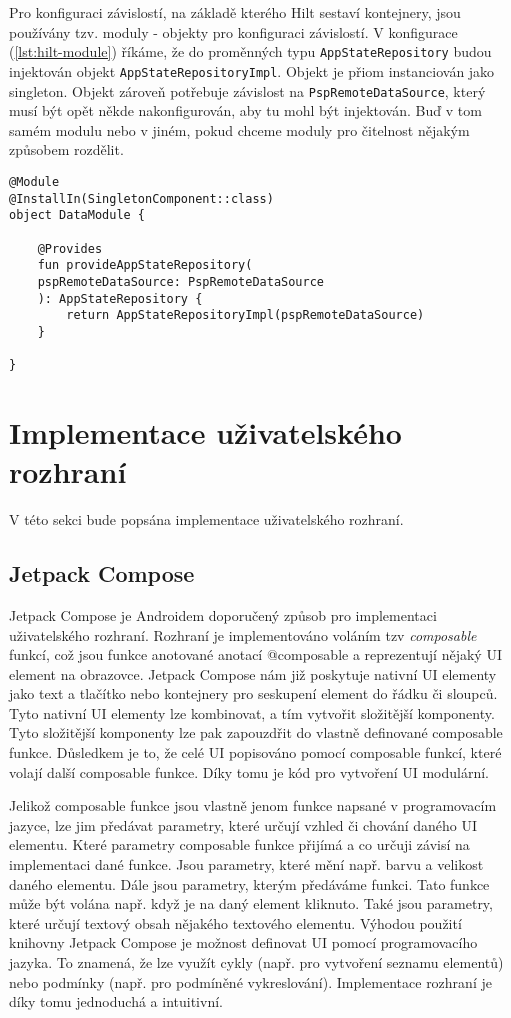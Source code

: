 \noindent Pro konfiguraci závislostí, na základě kterého Hilt sestaví kontejnery, jsou používány tzv. moduly - objekty pro konfiguraci závislostí. V konfigurace (\ref{lst:hilt-module}) říkáme, že do proměnných typu \lstinline|AppStateRepository| budou injektován objekt \lstinline|AppStateRepositoryImpl|. Objekt je přiom instanciován jako singleton. Objekt zároveň potřebuje závislost na \lstinline|PspRemoteDataSource|, který musí být opět někde nakonfigurován, aby tu mohl být injektován. Buď v tom samém modulu nebo v jiném, pokud chceme moduly pro čitelnost nějakým způsobem rozdělit.

\begin{lstlisting}[caption={Příklad konfigurace závislostí pro Hilt}, label={lst:hilt-module}, tabsize=2]
@Module
@InstallIn(SingletonComponent::class)
object DataModule {
	
	@Provides
	fun provideAppStateRepository(
	pspRemoteDataSource: PspRemoteDataSource
	): AppStateRepository {
		return AppStateRepositoryImpl(pspRemoteDataSource)
	}

}
\end{lstlisting}

\section {Implementace uživatelského rozhraní}
V této sekci bude popsána implementace uživatelského rozhraní.

\subsection*{Jetpack Compose}
\label{ssec:jetpack-compose}
Jetpack Compose je Androidem doporučený způsob pro implementaci uživatelského rozhraní. Rozhraní je implementováno voláním tzv \textit{composable} funkcí, což jsou funkce anotované anotací @composable a reprezentují nějaký UI element na obrazovce. Jetpack Compose nám již poskytuje nativní UI elementy jako text a tlačítko nebo kontejnery pro seskupení element do řádku či sloupců. Tyto nativní UI elementy lze kombinovat, a tím vytvořit složitější komponenty. Tyto složitější komponenty lze pak zapouzdřit do vlastně definované composable funkce. Důsledkem je to, že celé UI popisováno pomocí composable funkcí, které volají další composable funkce. Díky tomu je kód pro vytvoření UI modulární. 

Jelikož composable funkce jsou vlastně jenom funkce napsané v programovacím jazyce, lze jim předávat parametry, které určují vzhled či chování daného UI elementu. Které parametry composable funkce přijímá a co určuji závisí na implementaci dané funkce. Jsou parametry, které mění např. barvu a velikost daného elementu. Dále jsou parametry, kterým předáváme funkci. Tato funkce může být volána např. když je na daný element kliknuto. Také jsou parametry, které určují textový obsah nějakého textového elementu. Výhodou použití knihovny Jetpack Compose je možnost definovat UI pomocí programovacího jazyka. To znamená, že lze využít cykly (např. pro vytvoření seznamu elementů) nebo podmínky (např. pro podmíněné vykreslování). Implementace rozhraní je díky tomu jednoduchá a intuitivní.


